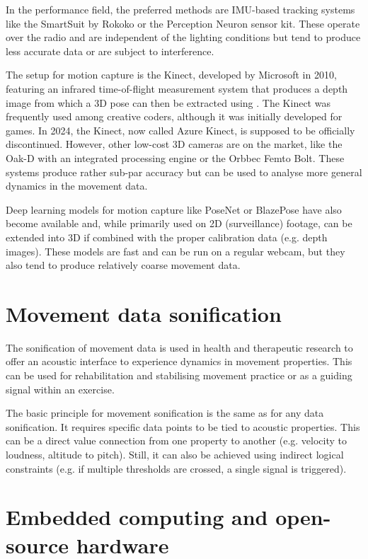 In the performance field, the preferred methods are IMU-based tracking systems like the SmartSuit by Rokoko or the Perception Neuron sensor kit. These operate over the radio and are independent of the lighting conditions but tend to produce less accurate data or are subject to interference.

The  setup for motion capture is the Kinect, developed by Microsoft in 2010, featuring an infrared time-of-flight measurement system that produces a depth image from which a 3D pose can then be extracted using . The Kinect was frequently used among creative coders, although it was initially developed for games. In 2024, the Kinect, now called Azure Kinect, is supposed to be officially discontinued. However, other low-cost 3D cameras are on the market, like the Oak-D with an integrated processing engine or the Orbbec Femto Bolt. These systems produce rather sub-par accuracy but can be used to analyse more general dynamics in the movement data.

Deep learning models for motion capture like PoseNet or BlazePose have also become available and, while primarily used on 2D (surveillance) footage, can be extended into 3D if combined with the proper calibration data (e.g. depth images). These models are fast and can be run on a regular webcam, but they also tend to produce relatively coarse movement data.

\section{Movement data sonification}

The sonification of movement data is used in health and therapeutic research to offer an acoustic interface to experience dynamics in movement properties. This can be used for rehabilitation and stabilising movement practice or as a guiding signal within an exercise.

The basic principle for movement sonification is the same as for any data sonification. It requires specific data points to be tied to acoustic properties. This can be a direct value connection from one property to another (e.g. velocity to loudness, altitude to pitch). Still, it can also be achieved using indirect logical constraints (e.g. if multiple thresholds are crossed, a single signal is triggered).


\section{Embedded computing and open-source hardware}
\label{section:embeddedComputing}

